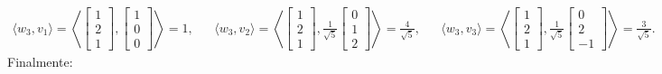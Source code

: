 \documentclass[11pt,letterpaper]{article}
\begin{document}
\begin{align*}
     \langle w_3,v_1\rangle=\left\langle \begin{bmatrix} 1\\2\\1 \end{bmatrix},\begin{bmatrix} 1\\0\\0 \end{bmatrix} \right\rangle=1, 
     &&\langle w_3,v_2\rangle=\left\langle \begin{bmatrix} 1\\2\\1 \end{bmatrix},\frac{1}{\sqrt{5}}\begin{bmatrix} 0\\1\\2 \end{bmatrix} \right\rangle=\frac{4}{\sqrt{5}}, 
     &&\langle w_3,v_3\rangle=\left\langle \begin{bmatrix} 1\\2\\1 \end{bmatrix},\frac{1}{\sqrt{5}}\begin{bmatrix} 0\\2\\-1 \end{bmatrix} \right\rangle=\frac{3}{\sqrt{5}}.
\end{align*}
Finalmente:
\end{document}
